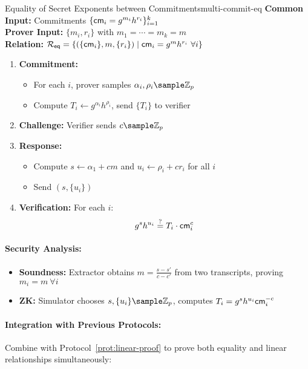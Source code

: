\begin{protocol}{Equality of Secret Exponents between Commitments}{multi-commit-eq}
\textbf{Common Input:} Commitments $\{\mathsf{cm}_i = g^{m_i}h^{r_i}\}_{i=1}^k$\\
\textbf{Prover Input:} $\{m_i, r_i\}$ with $m_1 = \cdots = m_k = m$\\
\textbf{Relation:} $\mathcal{R}_{\mathsf{eq}} = \left\{(\{\mathsf{cm}_i\}, m, \{r_i\}) \mid \mathsf{cm}_i = g^m h^{r_i}\ \forall i\right\}$

\begin{enumerate}
    \item \textbf{Commitment:}
    \begin{itemize}
        \item For each $i$, prover samples $\alpha_i, \rho_i \sample \Z_p$
        \item Compute $T_i \gets g^{\alpha_i}h^{\rho_i}$, send $\{T_i\}$ to verifier
    \end{itemize}
    
    \item \textbf{Challenge:} Verifier sends $c \sample \Z_p$
    
    \item \textbf{Response:}
    \begin{itemize}
        \item Compute $s \gets \alpha_1 + c m$ and $u_i \gets \rho_i + c r_i$ for all $i$
        \item Send $(s, \{u_i\})$
    \end{itemize}
    
    \item \textbf{Verification:} For each $i$:
    \[
    g^s h^{u_i} \stackrel{?}{=} T_i \cdot \mathsf{cm}_i^c
    \]
\end{enumerate}
\end{protocol}


\paragraph{Security Analysis:}
\begin{itemize}
    \item \textbf{Soundness:} Extractor obtains $m = \frac{s - s'}{c - c'}$ from two transcripts, proving $m_i = m\ \forall i$
    \item \textbf{ZK:} Simulator chooses $s, \{u_i\} \sample \Z_p$, computes $T_i = g^s h^{u_i} \mathsf{cm}_i^{-c}$
\end{itemize}

\paragraph{Integration with Previous Protocols:}
Combine with Protocol~\ref{prot:linear-proof} to prove both equality and linear relationships simultaneously:





